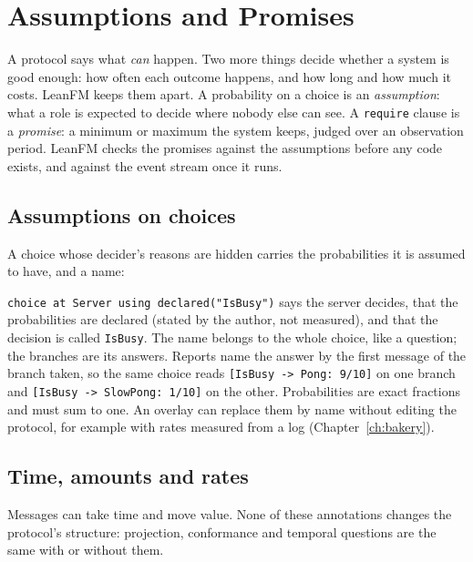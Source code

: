 \chapter{Assumptions and Promises}
\label{ch:assumptions}
\label{ch:generated-examples}

A protocol says what \emph{can} happen. Two more things decide whether a system
is good enough: how often each outcome happens, and how long and how much it
costs. LeanFM keeps them apart. A probability on a choice is an
\emph{assumption}: what a role is expected to decide where nobody else can see.
A \texttt{require} clause is a \emph{promise}: a minimum or maximum the system
keeps, judged over an observation period. LeanFM checks the promises against the
assumptions before any code exists, and against the event stream once it runs.

\section{Assumptions on choices}

A choice whose decider's reasons are hidden carries the probabilities it is
assumed to have, and a name:



\texttt{choice at Server using declared("IsBusy")} says the server decides, that
the probabilities are declared (stated by the author, not measured), and that the
decision is called \texttt{IsBusy}. The name belongs to the whole choice, like a
question; the branches are its answers. Reports name the answer by the first
message of the branch taken, so the same choice reads
\texttt{[IsBusy -> Pong: 9/10]} on one branch and
\texttt{[IsBusy -> SlowPong: 1/10]} on the other. Probabilities are exact
fractions and must sum to one. An overlay can replace them by name without
editing the protocol, for example with rates measured from a log
(Chapter~\ref{ch:bakery}).

\section{Time, amounts and rates}

Messages can take time and move value. None of these annotations changes the
protocol's structure: projection, conformance and temporal questions are the
same with or without them.

